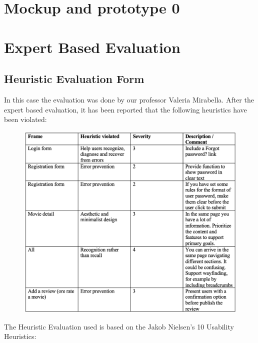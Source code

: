 \documentclass[12pt, a4paper]{article}
\begin{document}

\newpage

\section{Mockup and prototype 0}


\newpage

\section{Expert Based Evaluation}

\subsection{Heuristic Evaluation Form}
In this case the evaluation was done by our professor Valeria Mirabella. 
After the expert based evaluation, it has been reported that the following heuristics 
have been violated:
\begin{figure}[H]
	\centering
	\includegraphics[width=1\textwidth]{images/heuristicEvaluation.png}\\
\end{figure}
\noindent
The Heuristic Evaluation used is based on the Jakob Nielsen’s 10 Usability Heuristics:
\end{document}
